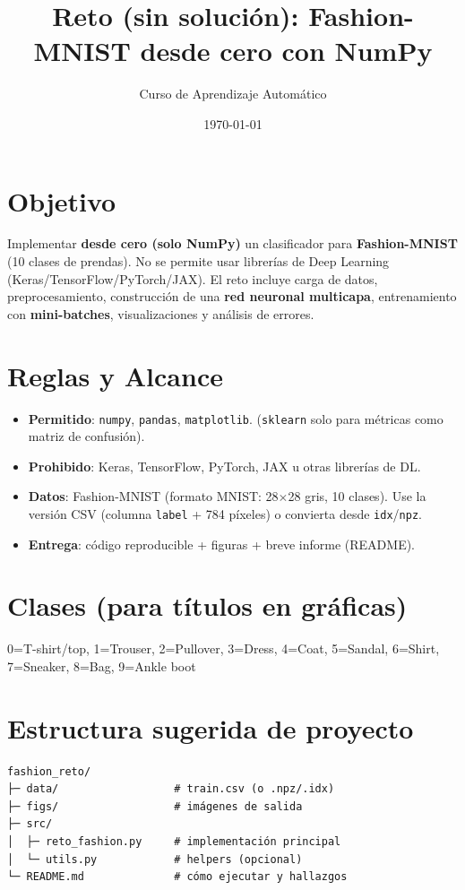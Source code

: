 \documentclass[12pt,a4paper]{article}
\title{\textbf{Reto (sin solución): Fashion-MNIST desde cero con NumPy}}
\author{Curso de Aprendizaje Automático}
\date{\today}
\begin{document}
\maketitle

\section*{Objetivo}
Implementar \textbf{desde cero (solo NumPy)} un clasificador para \textbf{Fashion-MNIST} (10 clases de prendas). No se permite usar librerías de Deep Learning (Keras/TensorFlow/PyTorch/JAX). El reto incluye carga de datos, preprocesamiento, construcción de una \textbf{red neuronal multicapa}, entrenamiento con \textbf{mini-batches}, visualizaciones y análisis de errores.

\section*{Reglas y Alcance}
\begin{itemize}[leftmargin=*,nosep]
  \item \textbf{Permitido}: \texttt{numpy}, \texttt{pandas}, \texttt{matplotlib}. (\texttt{sklearn} solo para métricas como matriz de confusión).
  \item \textbf{Prohibido}: Keras, TensorFlow, PyTorch, JAX u otras librerías de DL.
  \item \textbf{Datos}: Fashion-MNIST (formato MNIST: 28$\times$28 gris, 10 clases). Use la versión CSV (columna \texttt{label} + 784 píxeles) o convierta desde \texttt{idx}/\texttt{npz}.
  \item \textbf{Entrega}: código reproducible + figuras + breve informe (README).
\end{itemize}

\section*{Clases (para títulos en gráficas)}
\begin{center}
0=T-shirt/top, 1=Trouser, 2=Pullover, 3=Dress, 4=Coat, 5=Sandal, 6=Shirt, 7=Sneaker, 8=Bag, 9=Ankle boot
\end{center}

\section*{Estructura sugerida de proyecto}
\begin{verbatim}
fashion_reto/
├─ data/                  # train.csv (o .npz/.idx)
├─ figs/                  # imágenes de salida
├─ src/
│  ├─ reto_fashion.py     # implementación principal
│  └─ utils.py            # helpers (opcional)
└─ README.md              # cómo ejecutar y hallazgos
\end{verbatim}
\end{document}
